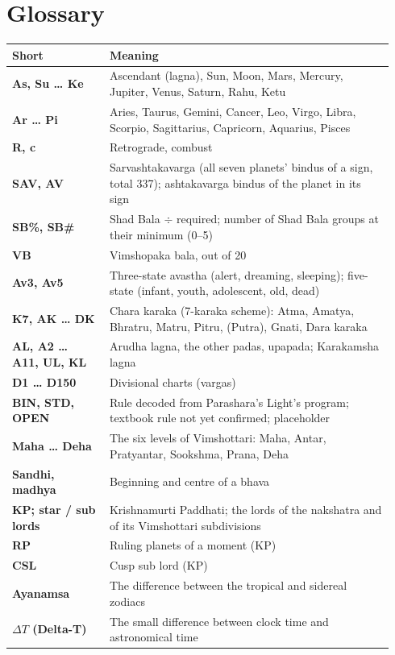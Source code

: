 \documentclass[11pt, a4paper]{article}
\newcommand{\PL}{Parashara's Light}
\begin{document}
\section{Glossary}
\label{sec:glossary}
\begin{longtable}{>{\bfseries}p{0.24\linewidth} >{\raggedright\arraybackslash}p{0.70\linewidth}}
\toprule
Short & Meaning \\
\midrule
\endhead
As, Su … Ke & Ascendant (lagna), Sun, Moon, Mars, Mercury, Jupiter, Venus, Saturn, Rahu, Ketu \\
Ar … Pi & Aries, Taurus, Gemini, Cancer, Leo, Virgo, Libra, Scorpio, Sagittarius, Capricorn, Aquarius, Pisces \\
R, c & Retrograde, combust \\
SAV, AV & Sarvashtakavarga (all seven planets' bindus of a sign, total 337); ashtakavarga bindus of the planet in its sign \\
SB\%, SB\# & Shad Bala $\div$ required; number of Shad Bala groups at their minimum (0--5) \\
VB & Vimshopaka bala, out of 20 \\
Av3, Av5 & Three-state avastha (alert, dreaming, sleeping); five-state (infant, youth, adolescent, old, dead) \\
K7, AK … DK & Chara karaka (7-karaka scheme): Atma, Amatya, Bhratru, Matru, Pitru, (Putra), Gnati, Dara karaka \\
AL, A2 … A11, UL, KL & Arudha lagna, the other padas, upapada; Karakamsha lagna \\
D1 … D150 & Divisional charts (vargas) \\
BIN, STD, OPEN & Rule decoded from \PL{}'s program; textbook rule not yet confirmed; placeholder \\
Maha … Deha & The six levels of Vimshottari: Maha, Antar, Pratyantar, Sookshma, Prana, Deha \\
Sandhi, madhya & Beginning and centre of a bhava \\
KP; star / sub lords & Krishnamurti Paddhati; the lords of the nakshatra and of its Vimshottari subdivisions \\
RP & Ruling planets of a moment (KP) \\
CSL & Cusp sub lord (KP) \\
Ayanamsa & The difference between the tropical and sidereal zodiacs \\
$\Delta T$ (Delta-T) & The small difference between clock time and astronomical time \\

\end{longtable}
\end{document}
